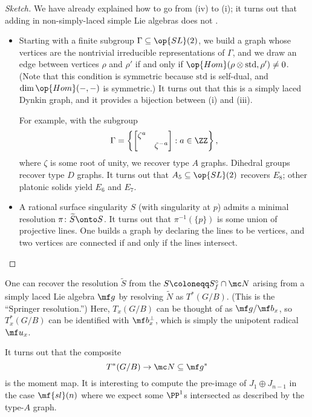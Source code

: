 \documentclass[../notes.tex]{subfiles}
\begin{document}
\begin{proof}[Sketch]
	We have already explained how to go from (iv) to (i); it turns out that adding in non-simply-laced simple Lie algebras does not .
	\begin{itemize}
		\item Starting with a finite subgroup $\Gamma\subseteq\op{SL}(2)$, we build a graph whose vertices are the nontrivial irreducible representations of $\Gamma$, and we draw an edge between vertices $\rho$ and $\rho'$ if and only if $\op{Hom}(\rho\otimes\mathrm{std},\rho')\ne0$. (Note that this condition is symmetric because $\mathrm{std}$ is self-dual, and $\dim\op{Hom}(-,-)$ is symmetric.) It turns out that this is a simply laced Dynkin graph, and it provides a bijection between (i) and (iii).
		
		For example, with the subgroup
		\[\Gamma=\left\{\begin{bmatrix}
			\zeta^a \\ & \zeta^{-a}
		\end{bmatrix}:a\in\ZZ\right\},\]
		where $\zeta$ is some root of unity, we recover type $A$ graphs. Dihedral groups recover type $D$ graphs. It turns out that $A_5\subseteq\op{SL}(2)$ recovers $E_8$; other platonic solids yield $E_6$ and $E_7$.

		\item A rational surface singularity $S$ (with singularity at $p$) admits a minimal resolution $\pi\colon\widetilde S\onto S$. It turns out that $\pi^{-1}(\{p\})$ is some union of projective lines. One builds a graph by declaring the lines to be vertices, and two vertices are connected if and only if the lines intersect.
		\qedhere
	\end{itemize}
\end{proof}
\begin{remark}
	One can recover the resolution $\widetilde S$ from the $S\coloneqq S_f^\circ\cap\mc N$ arising from a simply laced Lie algebra $\mf g$ by resolving $\widetilde N$ as $T^*(G/B)$. (This is the ``Springer resolution.'') Here, $T_x(G/B)$ can be thought of as $\mf g/\mf b_x$, so $T_x^*(G/B)$ can be identified with $\mf b_x^\perp$, which is simply the unipotent radical $\mf u_x$.
\end{remark}
\begin{remark}
	It turns out that the composite
	\[T^*(G/B)\to\mc N\subseteq\mf g^*\]
	is the moment map. It is interesting to compute the pre-image of $J_1\oplus J_{n-1}$ in the case $\mf{sl}(n)$ where we expect some $\PP^1$s intersected as described by the type-$A$ graph.
\end{remark}
\end{document}
